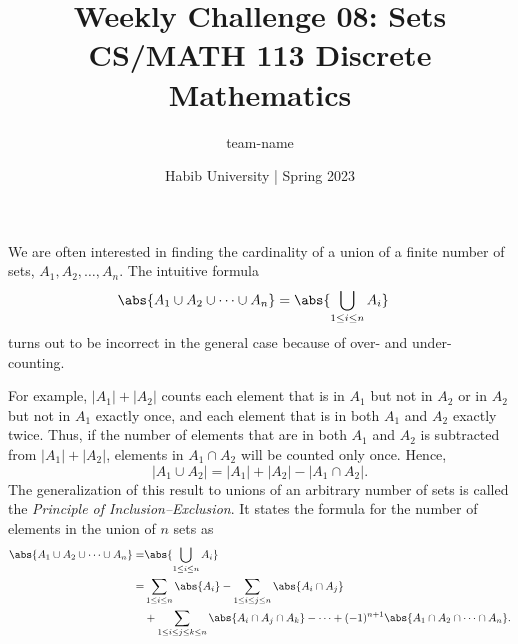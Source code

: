 \documentclass[a4paper]{exam}
\title{Weekly Challenge 08: Sets\\CS/MATH 113 Discrete Mathematics}
\author{team-name}  %
\date{Habib University | Spring 2023}
\begin{document}
\maketitle

\begin{questions}


  We are often interested in finding the cardinality of a union of a finite number of sets, $A_1,A_2,\ldots,A_n$. The intuitive formula
  \begin{align}
    \label{eq:wrong}
    \abs{A_1\cup A_2 \cup \dots \cup A_n} & = \abs{\bigcup_{1\leq i \leq n}A_i}
  \end{align}
  turns out to be incorrect in the general case because of over- and under- counting.
  
  For example, $|A_1| + |A_2|$ counts each element that is in $A_1$ but not in $A_2$ or in $A_2$ but not in $A_1$ exactly once, and each element that is in both $A_1$ and $A_2$ exactly twice. Thus, if the number of elements that are in both $A_1$ and $A_2$ is subtracted from $|A_1| + |A_2|$, elements in $A_1 \cap A_2$ will be counted only once. Hence,
  \[
    |A_1 \cup A_2| = |A_1| + |A_2| - |A_1 \cap A_2|.
  \]
  The generalization of this result to unions of an arbitrary number of sets is called the \textit{Principle of Inclusion–Exclusion}. It states the formula for the number of elements in the union of $n$ sets as
  \begin{align}
    \abs{A_1\cup A_2 \cup \dots \cup A_n} =&  \abs{\bigcup_{1\leq i \leq n}A_i} \nonumber \\ 
    =&  \sum_{1 \leq i \leq n}{\abs{A_i}} - \sum_{1\leq i \leq j \leq n}{\abs{A_i \cap A_j}} \nonumber   \\
                                           & + \sum_{1\leq i \leq j \leq k \leq n}{\abs{A_i \cap A_j \cap A_k}} - \dots + (-1)^{n+1}\abs{A_1 \cap A_2 \cap \dots \cap A_n}.     \label{eq:right}
  \end{align}
  
\end{questions}
\end{document}
